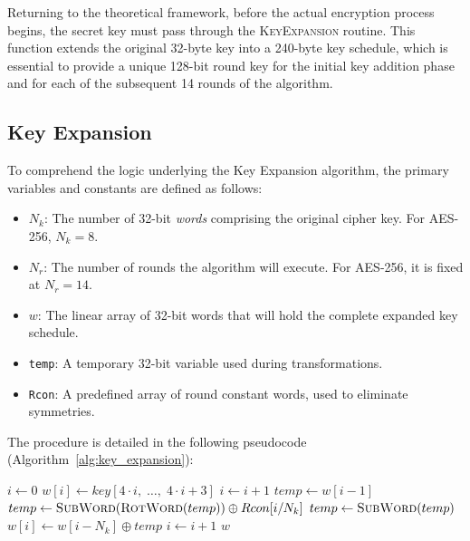 \documentclass[11pt,a4paper]{report}
\begin{document}
Returning to the theoretical framework, before the actual encryption process begins, the secret key must pass through the \textsc{KeyExpansion} routine. 
This function extends the original 32-byte key into a 240-byte key schedule, which is essential to provide a unique 128-bit round key for the initial key addition phase and for each of the subsequent 14 rounds of the algorithm.

\subsection{Key Expansion}
To comprehend the logic underlying the Key Expansion algorithm, the primary variables and constants are defined as follows:

\begin{itemize}
    \item $N_k$: The number of 32-bit \textit{words} comprising the original cipher key. For AES-256, $N_k = 8$.
    \item $N_r$: The number of rounds the algorithm will execute. For AES-256, it is fixed at $N_r = 14$.
    \item $w$: The linear array of 32-bit words that will hold the complete expanded key schedule.
    \item \texttt{temp}: A temporary 32-bit variable used during transformations.
    \item \texttt{Rcon}: A predefined array of round constant words, used to eliminate symmetries.
\end{itemize}

The procedure is detailed in the following pseudocode (Algorithm~\ref{alg:key_expansion}):
\begin{algorithm}[htbp]
\caption{Key Expansion Algorithm for AES-256}
\label{alg:key_expansion}
\begin{algorithmic}[1]
        \State $i \gets 0$
            \State $w[i] \gets key[4 \cdot i,\; \dots,\; 4 \cdot i + 3]$
            \State $i \gets i + 1$
        \EndWhile {}
            \State $temp \gets w[i - 1]$
                \State $temp \gets \textsc{SubWord}(\textsc{RotWord}(temp)) \oplus Rcon[i / N_k]$
                \State $temp \gets \textsc{SubWord}(temp)$
            \EndIf
            \State $w[i] \gets w[i - N_k] \oplus temp$
            \State $i \gets i + 1$
        \EndWhile
        \State \Return $w$
    \EndProcedure
\end{algorithmic}
\end{algorithm}
\end{document}

